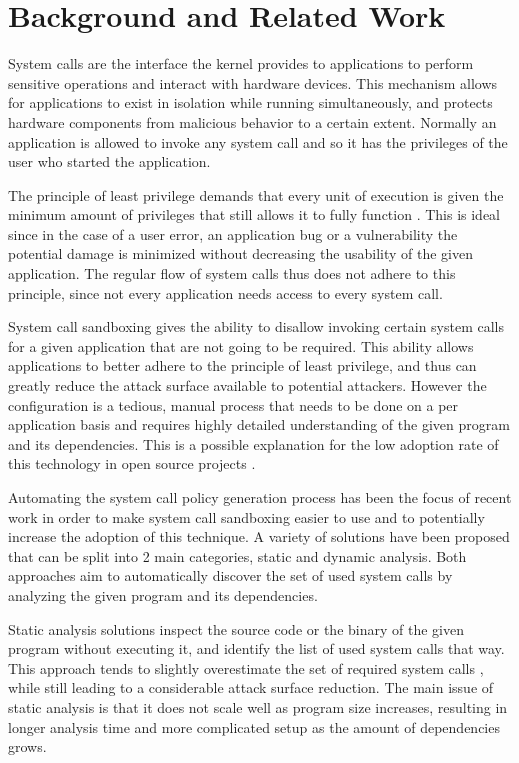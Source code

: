 \section{Background and Related Work}
\label{sec:background}
System calls are the interface the kernel provides to applications to perform sensitive operations and interact with hardware devices. This mechanism allows for applications to exist in isolation while running simultaneously, and protects hardware components from malicious behavior to a certain extent. Normally an application is allowed to invoke any system call and so it has the privileges of the user who started the application.

The principle of least privilege demands that every unit of execution is given the minimum amount of privileges that still allows it to fully function \cite{ref_plp_1}. This is ideal since in the case of a user error, an application bug or a vulnerability the potential damage is minimized without decreasing the usability of the given application. The regular flow of system calls thus does not adhere to this principle, since not every application needs access to every system call.

System call sandboxing gives the ability to disallow invoking certain system calls for a given application that are not going to be required. This ability allows applications to better adhere to the principle of least privilege, and thus can greatly reduce the attack surface available to potential attackers. However the configuration is a tedious, manual process that needs to be done on a per application basis and requires highly detailed understanding of the given program and its dependencies. This is a possible explanation for the low adoption rate of this technology in open source projects \cite{ref_adoption_1}.

Automating the system call policy generation process has been the focus of recent work in order to make system call sandboxing easier to use and to potentially increase the adoption of this technique. A variety of solutions have been proposed that can be split into 2 main categories, static and dynamic analysis. Both approaches aim to automatically discover the set of used system calls by analyzing the given program and its dependencies.

Static analysis solutions \cite{ref_sp_1,ref_sp_3,ref_sp_2} inspect the source code or the binary of the given program without executing it, and identify the list of used system calls that way. This approach tends to slightly overestimate the set of required system calls \cite{ref_dyn_1}, while still leading to a considerable attack surface reduction. The main issue of static analysis is that it does not scale well as program size increases, resulting in longer analysis time and more complicated setup as the amount of dependencies grows.

